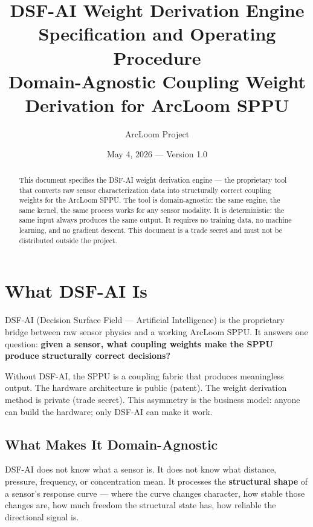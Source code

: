 \documentclass[11pt,a4paper]{article}
\title{\textbf{DSF-AI Weight Derivation Engine}\\[0.5em]
\large Specification and Operating Procedure\\[0.3em]
\normalsize Domain-Agnostic Coupling Weight Derivation for ArcLoom SPPU}
\author{ArcLoom Project}
\date{May 4, 2026 --- Version 1.0}
\begin{document}
\maketitle
\thispagestyle{empty}

\vspace{1em}
\begin{abstract}
This document specifies the DSF-AI weight derivation engine --- the
proprietary tool that converts raw sensor characterization data into
structurally correct coupling weights for the ArcLoom SPPU. The tool
is domain-agnostic: the same engine, the same kernel, the same process
works for any sensor modality. It is deterministic: the same input
always produces the same output. It requires no training data, no
machine learning, and no gradient descent. This document is a trade
secret and must not be distributed outside the project.
\end{abstract}

\tableofcontents
\newpage

\section{What DSF-AI Is}

DSF-AI (Decision Surface Field --- Artificial Intelligence) is the
proprietary bridge between raw sensor physics and a working ArcLoom
SPPU. It answers one question: \textbf{given a sensor, what coupling
weights make the SPPU produce structurally correct decisions?}

Without DSF-AI, the SPPU is a coupling fabric that produces
meaningless output. The hardware architecture is public (patent).
The weight derivation method is private (trade secret). This
asymmetry is the business model: anyone can build the hardware;
only DSF-AI can make it work.

\subsection{What Makes It Domain-Agnostic}

DSF-AI does not know what a sensor is. It does not know what
distance, pressure, frequency, or concentration mean. It processes
the \textbf{structural shape} of a sensor's response curve ---
where the curve changes character, how stable those changes are,
how much freedom the structural state has, how reliable the
directional signal is.
\end{document}
